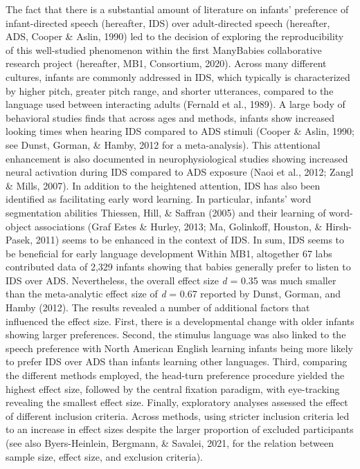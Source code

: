 \documentclass[
  english,
  man,floatsintext]{apa6}
\begin{document}
The fact that there is a substantial amount of literature on infants' preference of infant-directed speech (hereafter, IDS) over adult-directed speech (hereafter, ADS, Cooper \& Aslin, 1990) led to the decision of exploring the reproducibility of this well-studied phenomenon within the first ManyBabies collaborative research project (hereafter, MB1, Consortium, 2020). Across many different cultures, infants are commonly addressed in IDS, which typically is characterized by higher pitch, greater pitch range, and shorter utterances, compared to the language used between interacting adults (Fernald et al., 1989). A large body of behavioral studies finds that across ages and methods, infants show increased looking times when hearing IDS compared to ADS stimuli (Cooper \& Aslin, 1990; see Dunst, Gorman, \& Hamby, 2012 for a meta-analysis). This attentional enhancement is also documented in neurophysiological studies showing increased neural activation during IDS compared to ADS exposure (Naoi et al., 2012; Zangl \& Mills, 2007). In addition to the heightened attention, IDS has also been identified as facilitating early word learning. In particular, infants' word segmentation abilities Thiessen, Hill, \& Saffran (2005) and their learning of word-object associations (Graf Estes \& Hurley, 2013; Ma, Golinkoff, Houston, \& Hirsh-Pasek, 2011) seems to be enhanced in the context of IDS. In sum, IDS seems to be beneficial for early language development
Within MB1, altogether 67 labs contributed data of 2,329 infants showing that babies generally prefer to listen to IDS over ADS. Nevertheless, the overall effect size \emph{d} = 0.35 was much smaller than the meta-analytic effect size of \emph{d} = 0.67 reported by Dunst, Gorman, and Hamby (2012). The results revealed a number of additional factors that influenced the effect size. First, there is a developmental change with older infants showing larger preferences. Second, the stimulus language was also linked to the speech preference with North American English learning infants being more likely to prefer IDS over ADS than infants learning other languages. Third, comparing the different methods employed, the head-turn preference procedure yielded the highest effect size, followed by the central fixation paradigm, with eye-tracking revealing the smallest effect size. Finally, exploratory analyses assessed the effect of different inclusion criteria. Across methods, using stricter inclusion criteria led to an increase in effect sizes despite the larger proportion of excluded participants (see also Byers-Heinlein, Bergmann, \& Savalei, 2021, for the relation between sample size, effect size, and exclusion criteria).
\end{document}
